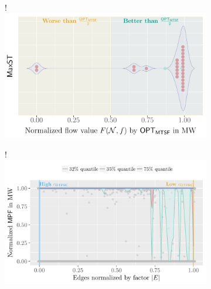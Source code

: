 \begin{center}
\begin{figure}[t!]
        \hspace{-0.3cm}
        \begin{subfigure}[b]{.498\textwidth}%
            \centering%
             {!} {
                \includegraphics{switchplacement/plots/plot-maxst-vs-mtsf-violin-swarm-StandAlone.pdf}
                \label{ch:switching:sec:evaluation:plot:twoApproximation_violin}%
            }
            \caption{}%
        \end{subfigure}%
        \hfill%
        \begin{subfigure}[b]{.498\textwidth}%
            \centering%
            \resizebox {\columnwidth} {!} {
                \includegraphics{switchplacement/plots/plot_dtp_betweenness_centrality_all_quantiles-StandAlone.pdf}
                \label{ch:switching:sec:evaluation:plot:dtp_betweenness_centrality_all_quantiles}%
            }%
            \caption{}%
            \label{ch:switching:sec:evaluation:fig:simulations:dtp}

\end{subfigure}
\end{figure}
\end{center}
